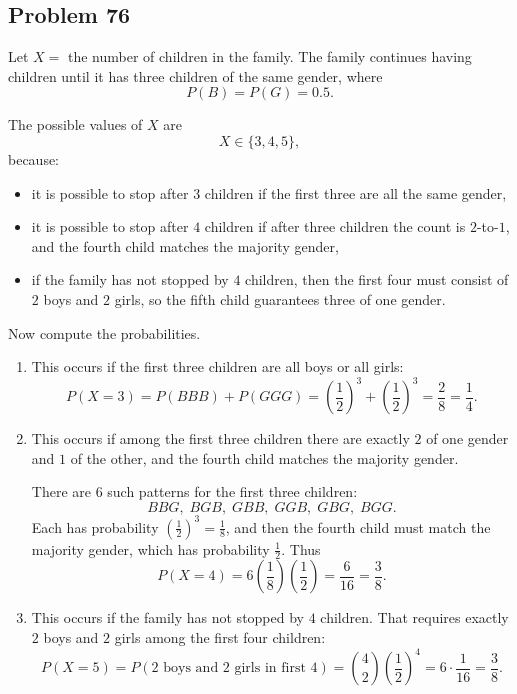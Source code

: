 \documentclass[11pt]{article}
\begin{document}
\subsection*{Problem 76}

Let \(X=\) the number of children in the family. The family continues having children until it has three children of the same gender, where
\[
P(B)=P(G)=0.5.
\]

The possible values of \(X\) are
\[
X\in\{3,4,5\},
\]
because:
\begin{itemize}
    \item it is possible to stop after \(3\) children if the first three are all the same gender,
    \item it is possible to stop after \(4\) children if after three children the count is \(2\)-to-\(1\), and the fourth child matches the majority gender,
    \item if the family has not stopped by \(4\) children, then the first four must consist of \(2\) boys and \(2\) girls, so the fifth child guarantees three of one gender.
\end{itemize}

Now compute the probabilities.

\begin{enumerate}
    \item[\(\boldsymbol{x=3}\)] This occurs if the first three children are all boys or all girls:
    \[
    P(X=3)=P(BBB)+P(GGG)=\left(\frac12\right)^3+\left(\frac12\right)^3=\frac{2}{8}=\frac14.
    \]

    \item[\(\boldsymbol{x=4}\)] This occurs if among the first three children there are exactly \(2\) of one gender and \(1\) of the other, and the fourth child matches the majority gender.

    There are \(6\) such patterns for the first three children:
    \[
    BBG,\; BGB,\; GBB,\; GGB,\; GBG,\; BGG.
    \]
    Each has probability \(\left(\frac12\right)^3=\frac18\), and then the fourth child must match the majority gender, which has probability \(\frac12\). Thus
    \[
    P(X=4)=6\left(\frac18\right)\left(\frac12\right)=\frac{6}{16}=\frac38.
    \]

    \item[\(\boldsymbol{x=5}\)] This occurs if the family has not stopped by \(4\) children. That requires exactly \(2\) boys and \(2\) girls among the first four children:
    \[
    P(X=5)=P(\text{2 boys and 2 girls in first 4})
    =\binom{4}{2}\left(\frac12\right)^4
    =6\cdot \frac{1}{16}
    =\frac38.
    \]
\end{enumerate}
\end{document}
